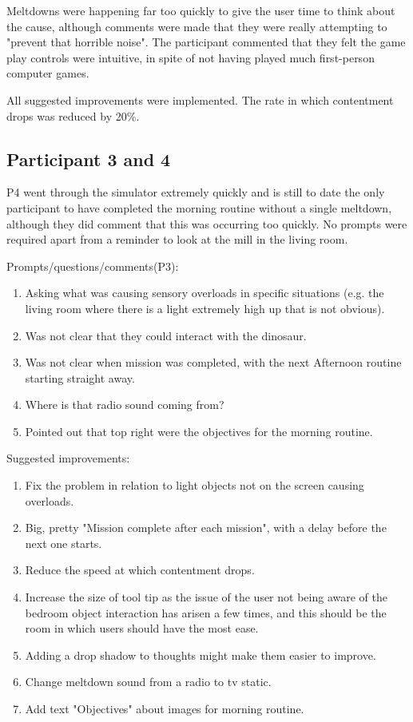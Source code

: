 \documentclass[11pt]{report}
\begin{document}
Meltdowns were happening far too quickly to give the user time to think about the cause, although comments were made that they were really attempting to "prevent that horrible noise". The participant commented that they felt the game play controls were intuitive, in spite of not having played much first-person computer games. 

All suggested improvements were implemented. The rate in which contentment drops was reduced by 20\%.

\subsection*{Participant 3 and 4}
P4 went through the simulator extremely quickly and is still to date the only participant to have completed the morning routine without a single meltdown, although they did comment that this was occurring too quickly. No prompts were required apart from a reminder to look at the mill in the living room. 


Prompts/questions/comments(P3):
\begin{enumerate}
\item Asking what was causing sensory overloads in specific situations (e.g. the living room where there is a light extremely high up that is not obvious).
\item Was not clear that they could interact with the dinosaur.
\item Was not clear when mission was completed, with the next Afternoon routine starting straight away.
\item Where is that radio sound coming from?
\item Pointed out that top right were the objectives for the morning routine.
\end{enumerate}

Suggested improvements:
\begin{enumerate}
\item Fix the problem in relation to light objects not on the screen causing overloads.
\item Big, pretty "Mission complete after each mission", with a delay before the next one starts.
\item Reduce the speed at which contentment drops.
\item Increase the size of tool tip as the issue of the user not being aware of the bedroom object interaction has arisen a few times, and this should be the room in which users should have the most ease. 
\item Adding a drop shadow to thoughts might make them easier to improve.
\item Change meltdown sound from a radio to tv static. 
\item Add text "Objectives" about images for morning routine. 
\end{enumerate}
\end{document}
